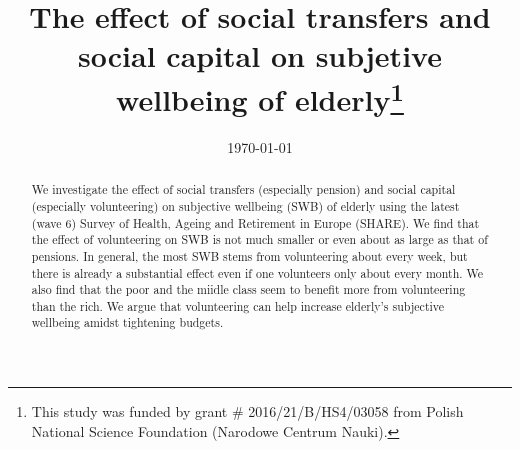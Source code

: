 \documentclass[10pt, letterpaper]{article}
\date{{}\today}
\title{  
The effect of social transfers and social capital on subjetive wellbeing of
elderly\footnote{This study was funded by grant \# 2016/21/B/HS4/03058 from
  Polish National Science Foundation (Narodowe Centrum Nauki).}
}
\author{
}
\begin{document}


\maketitle
\vspace{-.4in}
\begin{center}

\end{center}


\begin{abstract}
\noindent We investigate the effect of social transfers (especially pension) and
social capital (especially volunteering) on subjective wellbeing (SWB) of elderly using the latest (wave 6) Survey of Health, Ageing and Retirement in Europe
(SHARE). We find that the effect of volunteering on SWB is not much smaller or
even about as large as that of pensions. In general, the most SWB stems from volunteering about
every week, but there is already a substantial effect even if one volunteers only
about every month. We also find that the poor and the miidle
class seem to benefit more from volunteering than the rich.
We argue that volunteering can help increase elderly's subjective wellbeing amidst tightening budgets.
\end{abstract}
\vspace{.15in} 
\vspace{.25in} 
\end{document}
